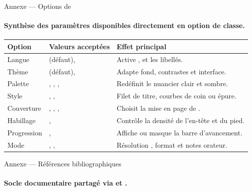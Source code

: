 
\begin{frame}{Annexe — Options de }
  \framesubtitle{Synthèse des paramètres disponibles directement en option de classe.}

  \footnotesize
  \begin{tabularx}{\textwidth}{L{2.5cm} L{5.3cm} Y}
    \toprule
    \textbf{Option} & \textbf{Valeurs acceptées} & \textbf{Effet principal} \\
    \midrule
    Langue &  (défaut),  & Active ,  et les libellés. \\
    Thème &  (défaut),  & Adapte fond, contrastes et interface. \\
    Palette & , , ,  & Redéfinit le nuancier clair et sombre. \\
    Style & , ,  & Filet de titre, courbes de coin ou épure. \\
    Couverture & , , ,  & Choisit la mise en page de . \\
    Habillage & ,  & Contrôle la densité de l'en-tête et du pied. \\
    Progression & ,  & Affiche ou masque la barre d'avancement. \\
    Mode & , ,  & Résolution , format et notes orateur. \\
    \bottomrule
  \end{tabularx}
\end{frame}

\begin{frame}[allowframebreaks]{Annexe — Références bibliographiques}
  \framesubtitle{Socle documentaire partagé via  et .}
  \nocite{*}
  \footnotesize
  \printbibliography[heading=none]
\end{frame}
